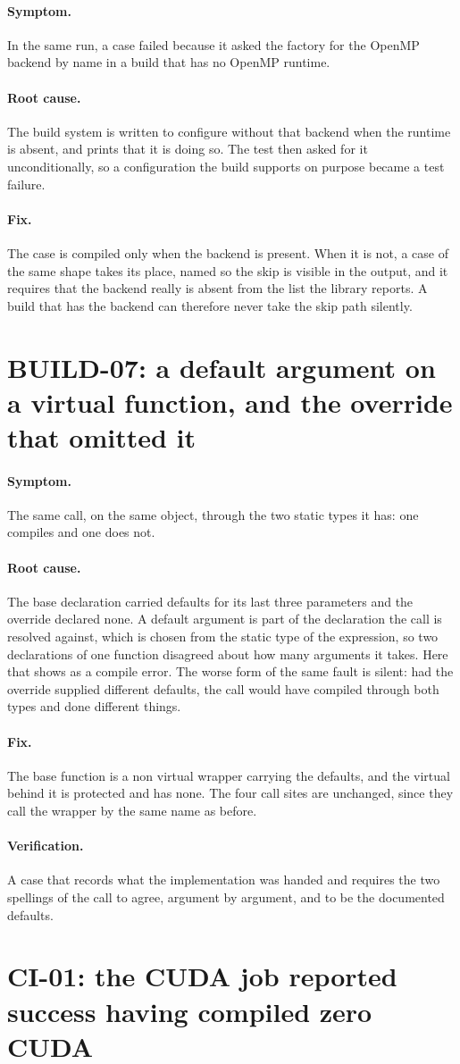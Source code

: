 \documentclass[11pt,a4paper]{report}
\newcommand{\symptom}[1]{\paragraph{Symptom.}#1}
\newcommand{\rootcause}[1]{\paragraph{Root cause.}#1}
\newcommand{\fix}[1]{\paragraph{Fix.}#1}
\newcommand{\verification}[1]{\paragraph{Verification.}#1}
\begin{document}
\symptom{In the same run, a case failed because it asked the factory for the
OpenMP backend by name in a build that has no OpenMP runtime.}

\rootcause{The build system is written to configure without that backend when the
runtime is absent, and prints that it is doing so. The test then asked for it
unconditionally, so a configuration the build supports on purpose became a test
failure.}

\fix{The case is compiled only when the backend is present. When it is not, a
case of the same shape takes its place, named so the skip is visible in the
output, and it requires that the backend really is absent from the list the
library reports. A build that has the backend can therefore never take the skip
path silently.}

\section{BUILD-07: a default argument on a virtual function, and the override that omitted it}

\symptom{The same call, on the same object, through the two static types it has:
one compiles and one does not.}

\rootcause{The base declaration carried defaults for its last three parameters
and the override declared none. A default argument is part of the declaration the
call is resolved against, which is chosen from the static type of the expression,
so two declarations of one function disagreed about how many arguments it takes.
Here that shows as a compile error. The worse form of the same fault is silent:
had the override supplied different defaults, the call would have compiled
through both types and done different things.}

\fix{The base function is a non virtual wrapper carrying the defaults, and the
virtual behind it is protected and has none. The four call sites are unchanged,
since they call the wrapper by the same name as before.}

\verification{A case that records what the implementation was handed and requires
the two spellings of the call to agree, argument by argument, and to be the
documented defaults.}

\section{CI-01: the CUDA job reported success having compiled zero CUDA}
\end{document}
